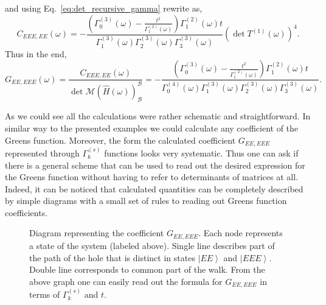 \documentclass{article}
\newcommand{\ket}[1]{\left\vert #1 \right\rangle}
\begin{document}
and using Eq.~\eqref{eq:det_recursive_gamma} rewrite as,
\begin{equation}
    C_{EEE,EE}(\omega) = - \frac{
    \left(
        \Gamma_0^{(3)}(\omega) -\frac{t^2}{\Gamma_1^{(2)}(\omega)}
    \right)
    \Gamma_1^{(2)}(\omega) t
    }{
        \Gamma_1^{(3)}(\omega)
        \Gamma_2^{(3)}(\omega)
        \Gamma_3^{(3)}(\omega)
    }
    \left(
        \det T^{(1)}(\omega)
    \right)^4.
\end{equation}
Thus in the end,
\begin{equation}
    G_{EE,EEE}(\omega) = \frac{C_{EEE,EE}(\omega)}{\det \mathcal{M}(\hat{H}(\omega))_\mathcal{B}^\mathcal{B}} = - \frac{
    \left(
        \Gamma_0^{(3)}(\omega) -\frac{t^2}{\Gamma_1^{(2)}(\omega)}
    \right)
    \Gamma_1^{(2)}(\omega) t
    }{
        \Gamma_0^{(4)}(\omega)
        \Gamma_1^{(3)}(\omega)
        \Gamma_2^{(3)}(\omega)
        \Gamma_3^{(3)}(\omega)
    }.
\end{equation}

As we could see all the calculations were rather schematic and straightforward. In similar way to the presented examples we could calculate any coefficient of the Greens function. Moreover, the form the calculated coefficient $G_{EE,EEE}$ represented through $\Gamma_k^{(s)}$ functions looks very systematic. Thus one can ask if there is a general scheme that can be used to read out the desired expression for the Greens function without having to refer to determinants of matrices at all. Indeed, it can be noticed that calculated quantities can be completely described by simple diagrams with a small set of rules to reading out Greens function coefficients.
\begin{figure}[ht!]
    \centering
{}
    \caption{Diagram representing the coefficient $G_{EE,EEE}$. Each node represents a state of the system (labeled above). Single line describes part of the path of the hole that is distinct in states $\ket{EE}$ and $\ket{EEE}$. Double line corresponds to common part of the walk. From the above graph one can easily read out the formula for $G_{EE,EEE}$ in terms of $\Gamma_k^{(s)}$ and $t$.}
    \label{fig:diag_EE-EEE}
\end{figure}
\end{document}
